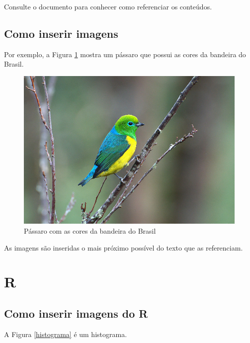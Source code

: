\documentclass[
	12pt,				%
	oneside,			%
	a4paper,			%
	english,			%
	french,				%
	spanish,			%
	brazil				%
	]{abntex2}
\begin{document}
Consulte o documento  para conhecer como
referenciar os conteúdos.

\hypertarget{como-inserir-imagens}{%
\section{Como inserir imagens}\label{como-inserir-imagens}}

Por exemplo, a Figura \ref{passaro} mostra um pássaro que possui as
cores da bandeira do Brasil.

\begin{figure}[htbp]
\hypertarget{passaro}{%
\caption{Pássaro com as cores da bandeira do Brasil}\label{passaro}
\begin{center}
\includegraphics[scale=0.4]{imagens/passaro.jpg}
\end{center}
}
\end{figure}

As imagens são inseridas o mais próximo possível do texto que as
referenciam.

\hypertarget{r}{%
\chapter{R}\label{r}}

\hypertarget{como-inserir-imagens-do-r}{%
\section{Como inserir imagens do R}\label{como-inserir-imagens-do-r}}

A Figura \ref{histograma} é um histograma.
\end{document}
